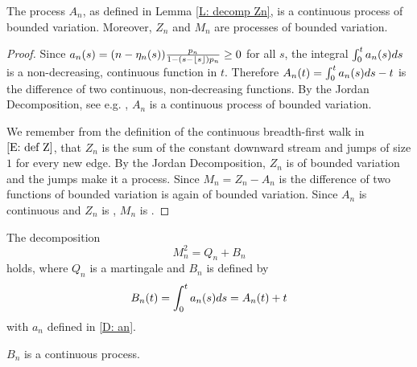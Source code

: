 \begin{corollary}
	The process $A_n$, as defined in Lemma \ref{L: decomp Zn}, is a continuous process of bounded variation.
	Moreover, $Z_n$ and $M_n$ are \cadlaq{} processes of bounded variation.
\end{corollary}

\begin{proof}
	Since $a_n(s) = (n - \eta_n(s)) \frac{p_n}{1-(s-\lfloor s\rfloor)p_n} \geq 0$ for all $s$,
	the integral $\int_{0}^{t}a_n(s)ds$ is a non-decreasing, continuous function in $t$.
	Therefore $A_n(t) = \int_{0}^{t}a_n(s)ds -t$ is the difference of two continuous, non-decreasing functions.
	By the Jordan Decomposition, see e.g. \cite{Mikosch2009}, $A_n$ is a continuous process of bounded variation.
	
	We remember from the definition of the continuous breadth-first walk in $\eqref{E: def Z}$,
	that $Z_n$ is the sum of the constant downward stream and jumps of size $1$ for every new edge.
	By the Jordan Decomposition, $Z_n$ is of bounded variation and the jumps make it a \cadlaq{} process.
	Since $M_n = Z_n - A_n$ is the difference of two functions of bounded variation is again of bounded variation.
	Since $A_n$ is continuous and $Z_n$ is \cadlaq{}, $M_n$ is \cadlaq{}.
\end{proof}


\begin{lemma} \label{L: decomp Mn}
	The decomposition
	\begin{equation} \label{E: decomp Mn}
	M_n^2 = Q_n + B_n
	\end{equation}
	holds, where $Q_n$ is a martingale and $B_n$ is defined by 
	\begin{equation} \label{D: Bn}
	B_n(t) = \int_{0}^{t} a_n(s)ds = A_n(t) + t
	\end{equation}
	with $a_n$ defined in \eqref{D: an}.
\end{lemma}
\begin{note} \label{N: decomp Mn}
	$B_n$ is a continuous process.
\end{note}

